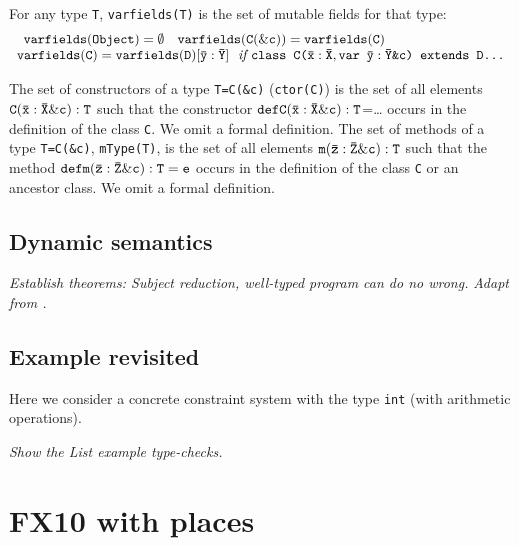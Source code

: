 \documentclass{article}
\def\FXten{{\sf FX10}}
\begin{document}

For any type {\tt T}, {\tt varfields(T)} is the set of mutable fields for that type:
$$
\begin{array}{l}
\begin{array}{ll}
\tt varfields(Object)=\emptyset & \tt varfields(C(\&c))=varfields(C)
\end{array} \\
\tt varfields(C)=varfields(D)[\bar{y}:\bar{Y}]\ \ \mbox{\em if 
{\tt class C($\tt \bar{\tt x}:\bar{\tt X},var\ \bar{\tt y}:\bar{\tt Y}$\&c) extends D\ldots}}  
\end{array}
$$

The set of constructors of a type {\tt T=C(\&c)} ({\tt ctor(C)}) is
the set of all elements {$\tt C(\bar{\tt x}:\bar{\tt X}\&c):T$} such
that the constructor {$\tt def C(\bar{\tt x}:\bar{\tt
X}\&c):T$=\ldots} occurs in the definition of the class {\tt C}. We omit a formal definition.
The set of methods of a type {\tt T=C(\&c)}, {\tt mType(T)}, is the
set of all elements {$\tt m(\bar{z}:\bar{Z}\&c):T$}  such that the method
{$\tt def m(\bar{z}:\bar{Z}\&c):T=e$} occurs in the definition of the class
{\tt C} or an ancestor class. We omit a formal definition.

\subsection{Dynamic semantics}

{\em Establish theorems: Subject reduction, well-typed program can do no wrong.}
{\em Adapt from \cite{X10-concur}.}

\subsection{Example revisited}

Here we consider a concrete constraint system with the type {\tt int} (with arithmetic operations).

{\em Show the List example type-checks.}

\section{\FXten{} with places}
\end{document}
